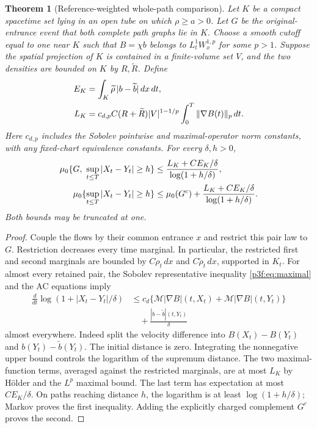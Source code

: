 \documentclass[11pt]{article}
\numberwithin{equation}{section}
\newtheorem{theorem}{Theorem}[section]
\theoremstyle{definition}
\theoremstyle{remark}
\begin{document}
\begin{theorem}[Reference-weighted whole-path comparison]
\label{p3f:thm:stability}
Let $K$ be a compact spacetime set lying in an open tube on which
$\rho\geq a>0$. Let $G$ be the original-entrance event that
\emph{both complete path graphs} lie in $K$. Choose a smooth cutoff
equal to one near $K$ such that $B=\chi b$ belongs to
$L^1_tW^{1,p}_x$ for some $p>1$. Suppose the spatial projection
of $K$ is contained in a finite-volume set $V$, and the two
densities are bounded on $K$ by $R,\widetilde R$.
Define
\begin{align}
 E_K&=\int_K\widetilde\rho\,|b-\widetilde b|\,dx\,dt,\notag\\
 L_K&=c_{d,p}C(R+\widetilde R)|V|^{1-1/p}
                \int_0^T\|\nabla B(t)\|_p\,dt .
 \label{p3f:eq:comparisonconstants}
\end{align}
Here $c_{d,p}$ includes the Sobolev pointwise and maximal-operator
norm constants, with any fixed-chart equivalence constants.
For every $\delta,h>0$,
\begin{align}
 \mu_0\{G,\ \sup_{t\leq T}|X_t-Y_t|\geq h\}
 &\leq\frac{L_K+CE_K/\delta}{\log(1+h/\delta)},\notag\\
 \mu_0\{\sup_{t\leq T}|X_t-Y_t|\geq h\}
 &\leq\mu_0(G^c)+
                \frac{L_K+CE_K/\delta}{\log(1+h/\delta)}.
 \label{p3f:eq:stability}
\end{align}
Both bounds may be truncated at one.
\end{theorem}

\begin{proof}
Couple the flows by their common entrance $x$ and restrict this pair
law to $G$. Restriction decreases every time marginal. In particular,
the restricted first and second marginals are bounded by
$C\rho_t\,dx$ and $C\widetilde\rho_t\,dx$, supported in $K_t$.
For almost every retained pair, the Sobolev representative
inequality \eqref{p3f:eq:maximal} and the AC equations imply
\begin{align*}
 \frac{d}{dt}\log(1+|X_t-Y_t|/\delta)
 &\leq c_d\{
       \mathcal M|\nabla B|(t,X_t)
       +\mathcal M|\nabla B|(t,Y_t)\}\\
 &\quad+\frac{|b-\widetilde b|(t,Y_t)}{\delta}
\end{align*}
almost everywhere. Indeed split the velocity difference into
$B(X_t)-B(Y_t)$ and $b(Y_t)-\widetilde b(Y_t)$.
The initial distance is zero. Integrating the nonnegative upper
bound controls the logarithm of the supremum distance. The two
maximal-function terms, averaged against the restricted marginals,
are at most $L_K$ by H\"older and the $L^p$ maximal bound. The last
term has expectation at most $CE_K/\delta$. On paths reaching
distance $h$, the logarithm is at least $\log(1+h/\delta)$;
Markov proves the first inequality. Adding the explicitly charged
complement $G^c$ proves the second.
\end{proof}
\end{document}
